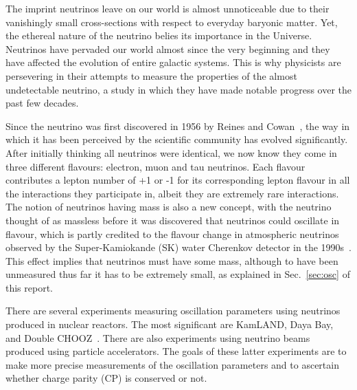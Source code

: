 \documentclass[aps,pra,12pt,notitlepage,tightenlines]{revtex4-1}
\begin{document}
The imprint neutrinos leave on our world is almost unnoticeable due to their vanishingly small cross-sections with respect to everyday baryonic matter. Yet, the ethereal nature of the neutrino belies its importance in the Universe. Neutrinos have pervaded our world almost since the very beginning and they have affected the evolution of entire galactic systems. This is why physicists are persevering in their attempts to measure the properties of the almost undetectable neutrino, a study in which they have made notable progress over the past few decades. 

Since the neutrino was first discovered in 1956 by Reines and Cowan~\cite{1956Natur.178..446R}, the way in which it has been perceived by the scientific community has evolved significantly. After initially thinking all neutrinos were identical, we now know they come in three different flavours: electron, muon and tau neutrinos. Each flavour contributes a lepton number of +1 or -1 for its corresponding lepton flavour in all the interactions they participate in, albeit they are extremely rare interactions. The notion of neutrinos having mass is also a new concept, with the neutrino thought of as massless before it was discovered that neutrinos could oscillate in flavour, which is partly credited to the flavour change in atmospheric neutrinos observed by the Super-Kamiokande (SK) water Cherenkov detector in the 1990s~\cite{Fukuda1998}. This effect implies that neutrinos must have some mass, although to have been unmeasured thus far it has to be extremely small, as explained in Sec.\ \ref{sec:osc} of this report.


There are several experiments measuring oscillation parameters using neutrinos produced in nuclear reactors. The most significant are KamLAND, Daya Bay, and Double CHOOZ~\cite{Suzuki2014, PhysRevLett.108.171803, PhysRevLett.108.131801}. There are also experiments using neutrino beams produced using particle accelerators. The goals of these latter experiments are to make more precise measurements of the oscillation parameters and to ascertain whether charge parity (CP) is conserved or not.
\end{document}
